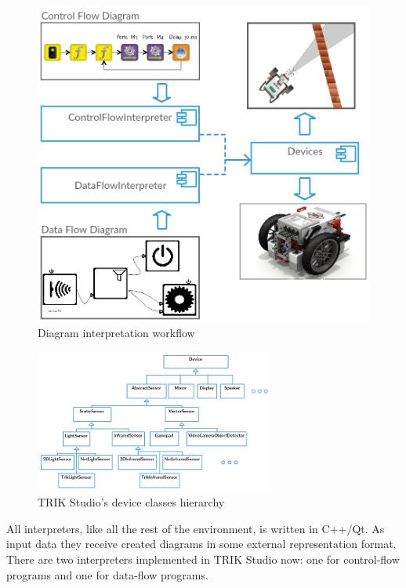 \documentclass[conference]{IEEEtran}
\begin{document}
\begin{figure}[ht]
    \centering
    \includegraphics[width=0.9\columnwidth]{TS_Interpreter_Architecture.png}
    \caption{Diagram interpretation workflow}
    \label{image:interpretersTSArch}
\end{figure}

\begin{figure}[ht]
    \centering
    \includegraphics[width=0.7\textwidth]{TS_Devices_Architecture.png}
    \caption{TRIK Studio's device classes hierarchy}
    \label{image:devicesTSArch}
\end{figure}

All interpreters, like all the rest of the environment, is written in C++/Qt. As input data they receive created diagrams in some external representation format. There are two interpreters implemented in TRIK Studio now: one for control-flow programs and one for data-flow programs.
\end{document}
